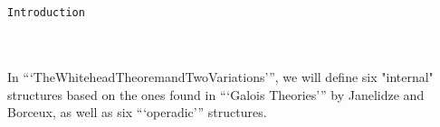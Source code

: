 \documentclass{book}
\theoremstyle{definition}
\renewcommand{\chapter}[1]{
\newpage
{
\Huge 
\begin{center}
\ \\
\ \\
\thispagestyle{empty}
\texttt{#1}
\end{center}}
\ \\
\ \\
}
\begin{document}
\chapter{Introduction}

In ```TheWhiteheadTheoremandTwoVariations''', we will define six "internal" structures based on the ones found in ```Galois Theories''' by Janelidze and Borceux, as well as six ```operadic''' structures.

\end{document}
